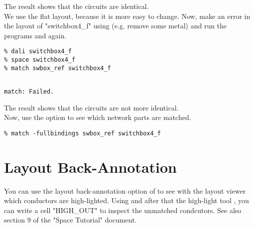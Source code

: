 \normalsize
The result shows that the circuits are identical.
\\[1 ex]
We use the flat layout, because it is more easy to change.
Now, make an error in the layout of "switchbox4\_f" using  (e.g. remove
some metal) and run the programs  and  again.
\small
\begin{Verbatim}
% dali switchbox4_f
% space switchbox4_f
% match swbox_ref switchbox4_f
\end{Verbatim}
\normalsize
\small \begin{Verbatim}[frame=single]

match: Failed.

\end{Verbatim}
\normalsize
The result shows that the circuits are not more identical.
\\[1 ex]
Now, use the option  to see which network parts are matched.
\small
\begin{Verbatim}
% match -fullbindings swbox_ref switchbox4_f
\end{Verbatim}
\normalsize

\section{Layout Back-Annotation}
You can use the layout back-annotation option  of  to see with the layout viewer 
which conductors are high-lighted.
Using  and after that the high-light tool , you can write
a cell "HIGH\_OUT" to inspect the unmatched condcutors.
See also section 9 of the "Space Tutorial" document.
